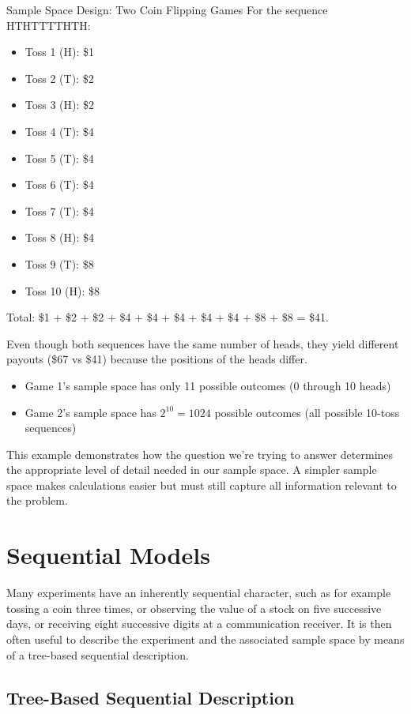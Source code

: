 \begin{exampleboxbreak}{Sample Space Design: Two Coin Flipping Games}
For the sequence HTHTTTTHTH:
\begin{itemize}
    \item Toss 1 (H): \$1
    \item Toss 2 (T): \$2
    \item Toss 3 (H): \$2
    \item Toss 4 (T): \$4
    \item Toss 5 (T): \$4
    \item Toss 6 (T): \$4
    \item Toss 7 (T): \$4
    \item Toss 8 (H): \$4
    \item Toss 9 (T): \$8
    \item Toss 10 (H): \$8
\end{itemize}
Total: \$1 + \$2 + \$2 + \$4 + \$4 + \$4 + \$4 + \$4 + \$8 + \$8 = \$41.

Even though both sequences have the same number of heads, they yield different payouts (\$67 vs \$41) because the positions of the heads differ.

\begin{itemize}
    \item Game 1's sample space has only 11 possible outcomes (0 through 10 heads)
    \item Game 2's sample space has $2^{10} = 1024$ possible outcomes (all possible 10-toss sequences)
\end{itemize}

This example demonstrates how the question we're trying to answer determines the appropriate level of detail needed in our sample space. A simpler sample space makes calculations easier but must still capture all information relevant to the problem.
\end{exampleboxbreak}


\section{Sequential Models}

Many experiments have an inherently sequential character, such as for example tossing a coin three times, or observing the value of a stock on five successive days, or receiving eight successive digits at a communication receiver. It is then often useful to describe the experiment and the associated sample space by means of a tree-based sequential description.

\subsection{Tree-Based Sequential Description}

